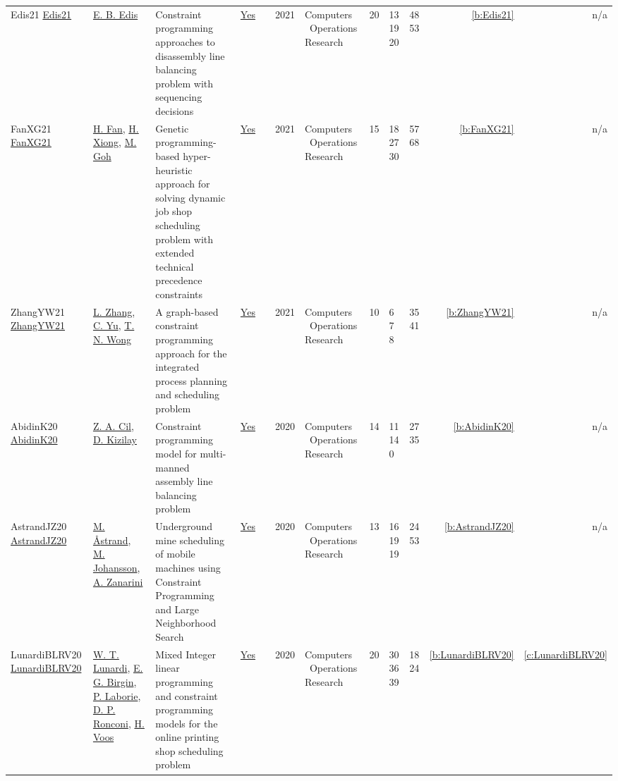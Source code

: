 {\begin{longtable}{>{\raggedright\arraybackslash}p{3cm}>{\raggedright\arraybackslash}p{4.5cm}>{\raggedright\arraybackslash}p{6.0cm}rrrp{2.5cm}rp{1cm}p{1cm}rr}
Edis21 \href{http://dx.doi.org/10.1016/j.cor.2020.105111}{Edis21} & \hyperref[auth:a346]{E. B. Edis} & Constraint programming approaches to disassembly line balancing problem with sequencing decisions & \href{../works/Edis21.pdf}{Yes} & \cite{Edis21} & 2021 & Computers \  Operations Research & 20 & 13 19 20 & 48 53 & \ref{b:Edis21} & n/a\\
FanXG21 \href{https://doi.org/10.1016/j.cor.2021.105401}{FanXG21} & \hyperref[auth:a476]{H. Fan}, \hyperref[auth:a477]{H. Xiong}, \hyperref[auth:a478]{M. Goh} & Genetic programming-based hyper-heuristic approach for solving dynamic job shop scheduling problem with extended technical precedence constraints & \href{../works/FanXG21.pdf}{Yes} & \cite{FanXG21} & 2021 & Computers \  Operations Research & 15 & 18 27 30 & 57 68 & \ref{b:FanXG21} & n/a\\
ZhangYW21 \href{https://doi.org/10.1016/j.cor.2021.105282}{ZhangYW21} & \hyperref[auth:a479]{L. Zhang}, \hyperref[auth:a480]{C. Yu}, \hyperref[auth:a481]{T. N. Wong} & A graph-based constraint programming approach for the integrated process planning and scheduling problem & \href{../works/ZhangYW21.pdf}{Yes} & \cite{ZhangYW21} & 2021 & Computers \  Operations Research & 10 & 6 7 8 & 35 41 & \ref{b:ZhangYW21} & n/a\\
AbidinK20 \href{http://dx.doi.org/10.1016/j.cor.2020.105069}{AbidinK20} & \hyperref[auth:a1382]{Z. A. Cil}, \hyperref[auth:a1381]{D. Kizilay} & Constraint programming model for multi-manned assembly line balancing problem & \href{../works/AbidinK20.pdf}{Yes} & \cite{AbidinK20} & 2020 & Computers \  Operations Research & 14 & 11 14 0 & 27 35 & \ref{b:AbidinK20} & n/a\\
AstrandJZ20 \href{https://doi.org/10.1016/j.cor.2020.105036}{AstrandJZ20} & \hyperref[auth:a74]{M. {\AA}strand}, \hyperref[auth:a75]{M. Johansson}, \hyperref[auth:a199]{A. Zanarini} & Underground mine scheduling of mobile machines using Constraint Programming and Large Neighborhood Search & \href{../works/AstrandJZ20.pdf}{Yes} & \cite{AstrandJZ20} & 2020 & Computers \  Operations Research & 13 & 16 19 19 & 24 53 & \ref{b:AstrandJZ20} & n/a\\
LunardiBLRV20 \href{https://doi.org/10.1016/j.cor.2020.105020}{LunardiBLRV20} & \hyperref[auth:a505]{W. T. Lunardi}, \hyperref[auth:a506]{E. G. Birgin}, \hyperref[auth:a118]{P. Laborie}, \hyperref[auth:a507]{D. P. Ronconi}, \hyperref[auth:a508]{H. Voos} & \cellcolor{green!10}Mixed Integer linear programming and constraint programming models for the online printing shop scheduling problem & \href{../works/LunardiBLRV20.pdf}{Yes} & \cite{LunardiBLRV20} & 2020 & Computers \  Operations Research & 20 & 30 36 39 & 18 24 & \ref{b:LunardiBLRV20} & \ref{c:LunardiBLRV20}\\

\end{longtable}}
